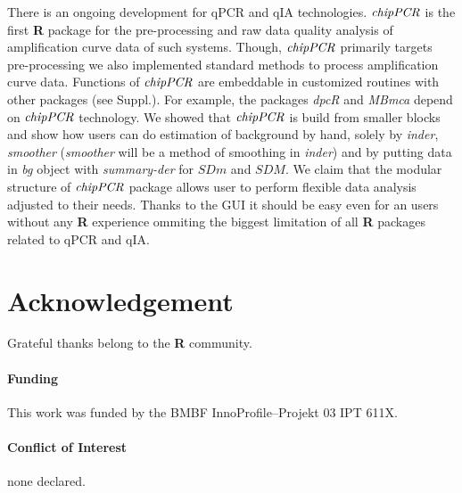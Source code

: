 \documentclass{bioinfo}
\begin{document}
There is an ongoing development for qPCR and qIA technologies. $\emph{chipPCR}$ 
is the first \textbf{R} package for the pre-processing and raw data quality 
analysis of amplification curve data of such systems. Though, $\emph{chipPCR}$ 
primarily targets pre-processing we also implemented standard methods to process 
amplification curve data. Functions of $\emph{chipPCR}$ are embeddable in 
customized routines with other packages (see Suppl.). For example, the 
packages \emph{dpcR} and \emph{MBmca} depend on $\emph{chipPCR}$ technology. We 
showed that $\emph{chipPCR}$ is build from smaller blocks and show how users can 
do estimation of background by hand, solely by \textsl{inder}, \textsl{smoother} 
(\textsl{smoother} will be a method of smoothing in \textsl{inder}) and by 
putting data in \textsl{bg} object with \textsl{summary-der} for $SDm$ and 
$SDM$. We claim that the modular structure of $\emph{chipPCR}$ package allows user 
to perform flexible data analysis adjusted to their needs.
Thanks to the GUI it should be easy even for an users without any \textbf{R} 
experience ommiting the biggest limitation of all \textbf{R} packages 
related to qPCR and qIA.


\section*{Acknowledgement}
Grateful thanks belong to the \textbf{R} community.

\paragraph{Funding\textcolon} This work was funded by the BMBF InnoProfile--Projekt 03 IPT 611X.

\paragraph{Conflict of Interest\textcolon} none declared.



%
%
%
%
%
%
%

\end{document}
